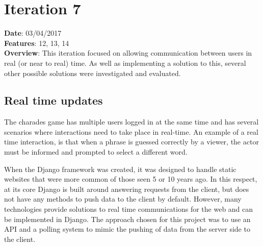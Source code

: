 \begin{figure}[h!]
\end{figure}

\newpage

\section{Iteration 7}
\textbf{Date}: 03/04/2017 \\
\textbf{Features}: 12, 13, 14 \\
\textbf{Overview}: This iteration focused on allowing communication between users in real (or near to real) time. As well as implementing a solution to this, several other possible solutions were investigated and evaluated. 

\subsection{Real time updates}
The charades game has multiple users logged in at the same time and has several scenarios where interactions need to take place in real-time. An example of a real time interaction, is that when a phrase is guessed correctly by a viewer, the actor must be informed and prompted to select a different word.

When the Django framework was created, it was designed to handle static websites that were more common of those seen 5 or 10 years ago. In this respect, at its core Django is built around answering requests from the client, but does not have any methods to push data to the client by default. However, many technologies provide solutions to real time communications for the web and can be implemented in Django. The approach chosen for this project was to use an API and a polling system to mimic the pushing of data from the server side to the client. 

